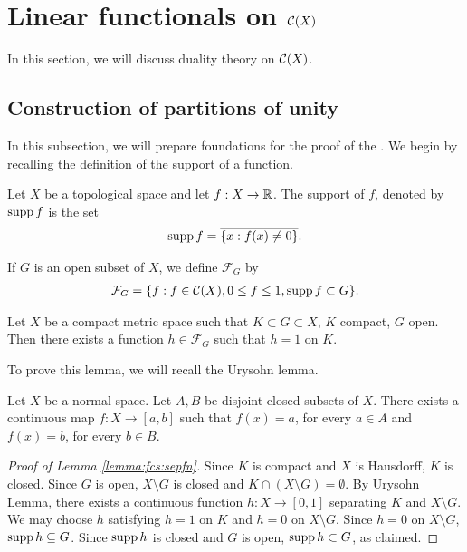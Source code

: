 \section{Linear functionals on ${\mathcal C}(X)$}
\label{section:appendix:functionals-cx}
In this section, we will discuss duality theory on ${\mathcal C}(X)$.
\subsection{Construction of partitions of unity}
In this subsection, we will prepare foundations for the proof of the . We begin by recalling the definition of the support of a function.
\begin{definition}
Let $X$ be a topological space and let $f : X \to {\mathbb R}$. The support of $f$, denoted by $\operatorname{supp} f$ is the set
\begin{align*}
    \operatorname{supp} f = \overline{\{ x : f(x) \neq 0 \}}.
\end{align*}
\end{definition}

If $G$ is an open subset of $X$, we define $\mathcal{F}_{G}$ by
\begin{align*}
    \mathcal{F}_{G} = \{ f : f \in {\mathcal C}(X), 0 \leq f \leq 1, \operatorname{supp} f \subset G \}.
\end{align*}

\begin{lemma}
\label{lemma:fcs:sepfn}
Let $X$ be a compact metric space such that $K \subset G \subset X$, $K$ compact, $G$ open.
Then there exists a function $h \in \mathcal{F}_{G}$ such that $h = 1$ on $K$.
\end{lemma}

To prove this lemma, we will recall the Urysohn lemma.
\begin{lemma}
Let $X$ be a normal space. Let $A, B$ be disjoint closed subsets of $X$. There exists a continuous map $f : X \to [a,b]$ such that $f(x) = a$, for every $a \in A$ and $f(x) = b$, for every $b \in B$.
\end{lemma}

\begin{proof}[Proof of Lemma \ref{lemma:fcs:sepfn}]
Since $K$ is compact and $X$ is Hausdorff, $K$ is closed. Since $G$ is open, $X \setminus G$ is closed and $K \cap (X \setminus G) = \emptyset$. By Urysohn Lemma, there exists a continuous function $h : X \to [0,1]$ separating $K$ and $X \setminus G$. We may choose $h$ satisfying $h = 1$ on $K$ and  $h = 0$ on $X \setminus G$. Since $h = 0$ on $X \setminus G$, $\operatorname{supp} h \subseteq G$. Since $\operatorname{supp} h$ is closed and $G$ is open, $\operatorname{supp} h \subset G$, as claimed.
\end{proof}

